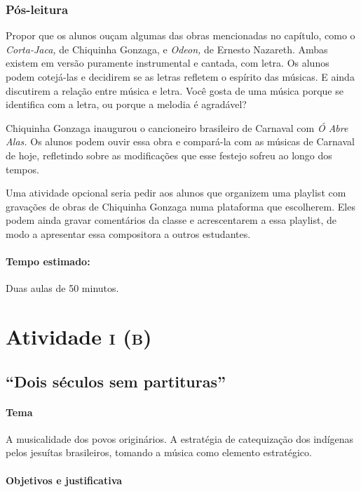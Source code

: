\documentclass[11pt]{extarticle}
\begin{document}
\subsubsection{Pós-leitura}

Propor que os alunos ouçam algumas das obras mencionadas no capítulo,
como o \emph{Corta-Jaca,} de Chiquinha Gonzaga, e \emph{Odeon,} de
Ernesto Nazareth. Ambas existem em versão puramente instrumental e
cantada, com letra. Os alunos podem cotejá-las e decidirem se as letras
refletem o espírito das músicas. E ainda discutirem a relação entre
música e letra. Você gosta de uma música porque se identifica com a
letra, ou porque a melodia é agradável?

Chiquinha Gonzaga inaugurou o cancioneiro brasileiro de Carnaval com
\emph{Ó Abre Alas.} Os alunos podem ouvir essa obra e compará-la com as
músicas de Carnaval de hoje, refletindo sobre as modificações que esse
festejo sofreu ao longo dos tempos.

Uma atividade opcional seria pedir aos alunos que organizem uma playlist com gravações de obras de Chiquinha Gonzaga numa plataforma que escolherem. Eles podem ainda gravar comentários da classe e acrescentarem a essa playlist, de modo a apresentar essa compositora a outros estudantes.   


\paragraph{Tempo estimado:} Duas aulas de 50 minutos.



\section{Atividade \textsc{i (b)}}
\subsection{“Dois séculos sem partituras”}

\paragraph{Tema} A musicalidade dos povos originários. A estratégia de catequização dos
indígenas pelos jesuítas brasileiros, tomando a música como elemento
estratégico.  

\paragraph{Objetivos e justificativa}
\end{document}
